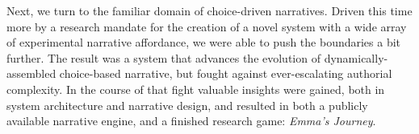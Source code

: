 Next, we turn to the familiar domain of choice-driven narratives. Driven this time more by a research mandate for the creation of a novel system with a wide array of experimental narrative affordance, we were able to push the boundaries a bit further. The result was a system that advances the evolution of dynamically-assembled choice-based narrative, but fought against ever-escalating authorial complexity. In the course of that fight valuable insights were gained, both in system architecture and narrative design, and resulted in both a publicly available narrative engine, and a finished research game: \textit{Emma's Journey}.

